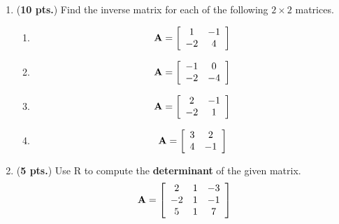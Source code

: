 \documentclass[13pt]{article}\usepackage[]{graphicx}\usepackage[]{color}
\begin{document}
{\begin{enumerate}
\begin{enumerate}
      \item 
      \[ {\bf A} = \left[\begin{array}{ccc} 2 & 1 & -3 \\ 2 & 1 & -1 \\ -4 & 6 & 10 \end{array} \right], \ \ \ {\bf B} = \left[\begin{array}{ccc} -1 & 0 & 2 \\ 1 & 0 & -1 \\ -1 & -1 & -1 \end{array} \right]\]
  \end{enumerate}
  
  \newpage
  
  \item ({\bf 10 pts.}) Find the inverse matrix for each of the following $2\times 2$ matrices.  
    \begin{enumerate}
      \item 
      \[ {\bf A} = \left[\begin{array}{cc} 1 & -1 \\ -2 & 4  \end{array} \right] \]
       \item 
      \[ {\bf A} = \left[\begin{array}{cc} -1 & 0 \\ -2 & -4  \end{array} \right] \]
       \item 
      \[ {\bf A} = \left[\begin{array}{cc} 2 & -1 \\ -2 & 1  \end{array} \right] \]
       \item 
      \[ {\bf A} = \left[\begin{array}{cc} 3 & 2 \\ 4 & -1  \end{array} \right] \]
  \end{enumerate}
  
  \newpage
  
  \item ({\bf 5 pts.})  Use R to compute the {\bf determinant} of the given matrix. 
 \[ {\bf A} = \left[\begin{array}{ccc} 2 & 1 & -3 \\ -2 & 1 & -1 \\ 5 & 1 & 7 \end{array} \right]\]
 
 \vspace{2.5in}
 

\end{enumerate}}
\end{document}
